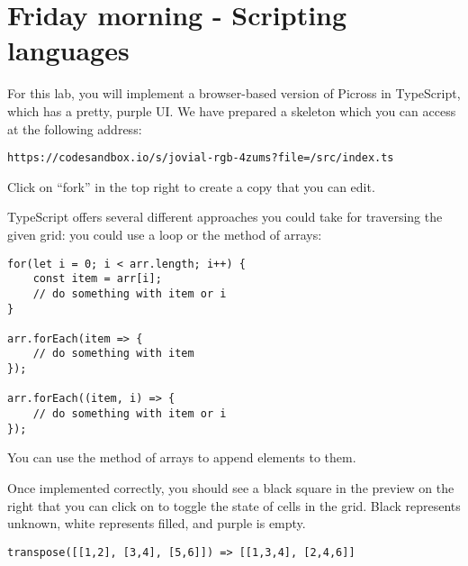 \section{Friday morning - Scripting languages}

For this lab, you will implement a browser-based version of Picross in TypeScript, which has a pretty, purple UI. We have prepared a skeleton which you can access at the following address:

\begin{center}\small
    \texttt{https://codesandbox.io/s/jovial-rgb-4zums?file=/src/index.ts}
\end{center}

Click on ``fork'' in the top right to create a copy that you can edit.

\taskLine



TypeScript offers several different approaches you could take for traversing the given grid: you could use a  loop or the  method of arrays:

\begin{verbatim}
for(let i = 0; i < arr.length; i++) {
    const item = arr[i];
    // do something with item or i
}

arr.forEach(item => {
    // do something with item
});

arr.forEach((item, i) => {
    // do something with item or i
});
\end{verbatim}
You can use the  method of arrays to append elements to them.

Once implemented correctly, you should see a black square in the preview on the right that you can click on to toggle the state of cells in the grid. Black represents unknown, white represents filled, and purple is empty.

\pagebreak

\begin{verbatim}
transpose([[1,2], [3,4], [5,6]]) => [[1,3,4], [2,4,6]]
\end{verbatim}

